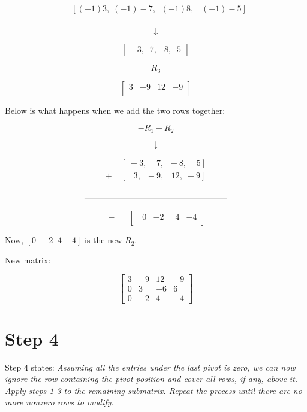 \documentclass[
  letterpaper,
  DIV=11,
  numbers=noendperiod]{scrreprt}
\begin{document}
\[
\begin{align*}
    &\left[ (-1)3,  \;(-1)-7, \;\; (-1)8, \;\;\; (-1)-5 \right] \\
\end{align*}
\]

\[
\downarrow
\]

\[
\begin{bmatrix}
    -3, \;\;7, -8, \;\;5
\end{bmatrix}
\]

\[
R_3
\]

\[
\begin{bmatrix}
    3 & -9 & 12 & -9 \\
\end{bmatrix}
\]

Below is what happens when we add the two rows together:

\[
-R_1 + R_2
\]

\[
\downarrow
\]

\[
\begin{array}{cc}
    &\left[\;-3,  \;\;\;\;7, \;\; -8, \;\;\;\; 5 \right] \\
    +\; &\left[ \;\;\;3, \;\; -9, \;\;\;12, \; -9 \right]
\end{array}
\]

\[
\rule{6cm}{0.4pt}
\]

\[
=\;\;\;\;\;\begin{bmatrix}
    \;\;0 & -2 & \;\;4 & -4 \\
\end{bmatrix}
\]

Now, \(\left[0 \; -2 \;\; 4 -4 \right]\) is the new \(R_2\).

New matrix:

\[
\begin{bmatrix}
    3 & -9 & 12 & -9 \\
    0 & 3 & -6 & 6 \\
    0 & -2 & 4 & -4
\end{bmatrix}
\]

\chapter{Step 4}

Step 4 states: \emph{Assuming all the entries under the last pivot is
zero, we can now ignore the row containing the pivot position and cover
all rows, if any, above it. Apply steps 1-3 to the remaining submatrix.
Repeat the process until there are no more nonzero rows to modify.}
\end{document}
